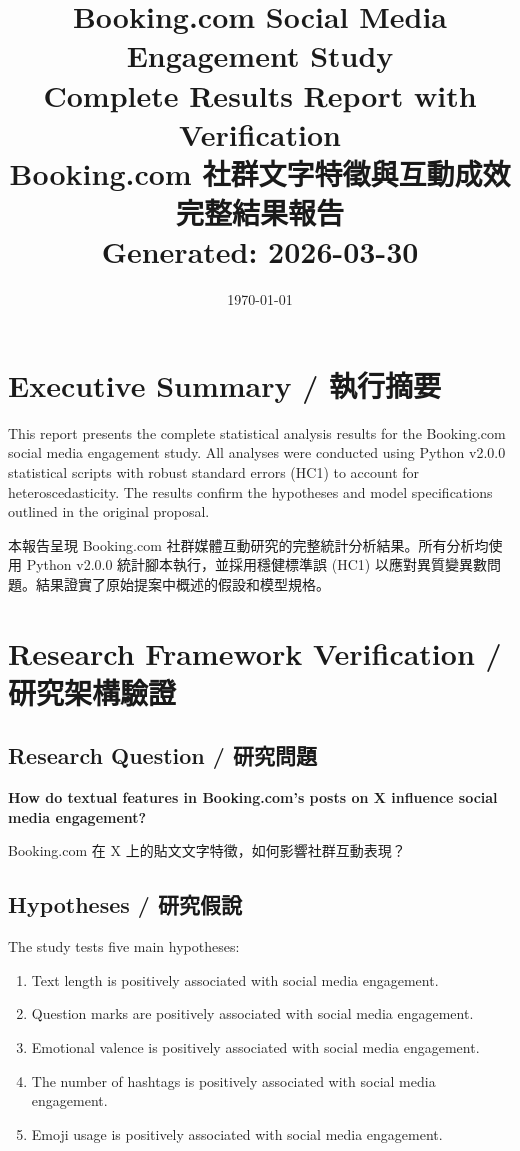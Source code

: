 \documentclass[12pt,a4paper,fontset=none]{ctexart}
\title{Booking.com Social Media Engagement Study\\
Complete Results Report with Verification\\[0.5em]
\large Booking.com 社群文字特徵與互動成效完整結果報告\\[0.5em]
\small Generated: 2026-03-30}
\author{}
\date{\today}
\begin{document}
\maketitle
\tableofcontents
\newpage

\section*{Executive Summary / 執行摘要}

This report presents the complete statistical analysis results for the Booking.com social media engagement study. All analyses were conducted using Python v2.0.0 statistical scripts with robust standard errors (HC1) to account for heteroscedasticity. The results confirm the hypotheses and model specifications outlined in the original proposal.

本報告呈現 Booking.com 社群媒體互動研究的完整統計分析結果。所有分析均使用 Python v2.0.0 統計腳本執行，並採用穩健標準誤 (HC1) 以應對異質變異數問題。結果證實了原始提案中概述的假設和模型規格。

\section{Research Framework Verification / 研究架構驗證}

\subsection{Research Question / 研究問題}
\textbf{How do textual features in Booking.com's posts on X influence social media engagement?}

Booking.com 在 X 上的貼文文字特徵，如何影響社群互動表現？

\subsection{Hypotheses / 研究假說}

The study tests five main hypotheses:

\begin{enumerate}[label=H\arabic*.]
    \item Text length is positively associated with social media engagement.
    \item Question marks are positively associated with social media engagement.
    \item Emotional valence is positively associated with social media engagement.
    \item The number of hashtags is positively associated with social media engagement.
    \item Emoji usage is positively associated with social media engagement.
\end{enumerate}
\end{document}
